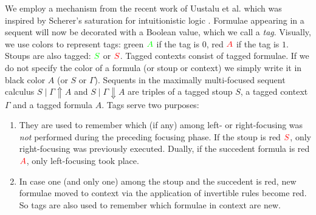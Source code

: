 \documentclass[runningheads]{llncs}
\newcommand{\red}[1]{{\color{red}#1}}
\newcommand{\green}[1]{{\color{green}#1}}
\newcommand{\up}{\Uparrow}
\newcommand{\dn}{\Downarrow}
\begin{document}
We employ a mechanism from the recent work of Uustalu et al. \cite{UVW:protsn} which was inspired by Scherer's saturation for intuitionistic logic \cite{scherer:simple:2015}. Formulae appearing in a sequent will now be decorated with a Boolean value, which we call a \emph{tag}. Visually, we use colors to represent tags: green $\green{A}$ if the tag is $0$, red $\red{A}$ if the tag is $1$.
Stoups are also tagged: $\green{S}$ or $\red{S}$. Tagged contexts consist of tagged formulae. If we do not specify the color of a formula (or stoup or context) we simply write it in black color $A$ (or $S$ or $\Gamma$). Sequents in the maximally multi-focused sequent calculus $S \mid \Gamma \up A$ and $S \mid \Gamma \dn A$ are triples of a tagged stoup $S$, a tagged context $\Gamma$ and a tagged formula $A$. Tags serve two purposes:
\begin{enumerate}
\item They are used to remember which (if any) among left- or right-focusing was \emph{not} performed during the preceding focusing phase. If the stoup is red $\red{S}$, only right-focusing was previously executed. Dually, if the succedent formula is red $\red{A}$, only left-focusing took place. \item In case one (and only one) among the stoup and the succedent is red, new formulae moved to context via the application of invertible rules become red. So tags are also used to remember which formulae in context are new.
\end{enumerate}
\end{document}
